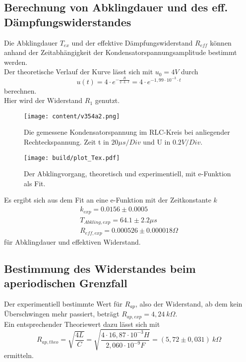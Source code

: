 \subsection{Berechnung von Abklingdauer und des eff. Dämpfungswiderstandes}
\label{subsec:Abklingdauer und R_daempf}

Die Abklingdauer $T_{ex}$ und der effektive Dämpfungswiderstand $R_{eff}$ können anhand der Zeitabhängigkeit der Kondensatorspannungsamplitude 
bestimmt werden.\\

Der theoretische Verlauf der Kurve lässt sich mit $u_0 = 4V$ durch 
\begin{equation*}
    u(t) = 4 \cdot e^{-\frac{R}{2 \cdot L \cdot t}} = 4 \cdot e^{- 1,99 \cdot 10^{-3} \cdot t}
\end{equation*}
berechnen.\\
Hier wird der Widerstand $R_1$ genutzt. 

\begin{figure}[H]
  \centering
  \texttt{[image: content/v354a2.png]}
  \caption{Die gemessene Kondensatorspannung im RLC-Kreis bei anliegender Rechteckspannung. Zeit t in $20\mu s/Div$ und U in $0.2V/Div$.}
  \label{fig:MessApp}
\end{figure}



\begin{figure}
  \centering
  \texttt{[image: build/plot\_Tex.pdf]}
  \caption{Der Abklingvorgang, theoretisch und experimentiell, mit e-Funktion als Fit.}
  \label{fig:plot_abklingdauer}
\end{figure}

Es ergibt sich aus dem Fit an eine e-Funktion mit der Zeitkonstante $k$
\begin{align*}
  k_{exp} = 0.0156 \pm 0.0005 \\
  T_{Abkling,exp} = 64.1 \pm 2.2 \mu s \\
  R_{eff,exp} = 0.000526 \pm 0.000018 \Omega 
\end{align*}
für Abklingdauer und effektiven Widerstand.




\subsection{Bestimmung des Widerstandes beim aperiodischen Grenzfall}
\label{R_ap}

Der experimentiell bestimmte Wert für $R_{ap}$, also der Widerstand, ab dem kein Überschwingen mehr passiert, beträgt $R_{ap,exp} = 4,24 \: k\Omega$. \\
Ein entsprechender Theoriewert dazu lässt sich mit 
\begin{equation*}
  R_{ap,theo} = \sqrt{\frac{4L}{C}} = \sqrt{\frac{4 \cdot 16,87 \cdot 10^{-3}H}{2,060 \cdot 10^{-9}F}} = (5,72 \pm 0,031) \: k\Omega
\end{equation*}
ermitteln.






